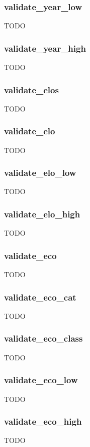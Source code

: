\documentclass{article}
\begin{document}
\subsubsection*{validate\_year\_low}
TODO

\subsubsection*{validate\_year\_high}
TODO

\subsubsection*{validate\_elos}
TODO

\subsubsection*{validate\_elo}
TODO

\subsubsection*{validate\_elo\_low}
TODO

\subsubsection*{validate\_elo\_high}
TODO

\subsubsection*{validate\_eco}
TODO

\subsubsection*{validate\_eco\_cat}
TODO

\subsubsection*{validate\_eco\_class}
TODO

\subsubsection*{validate\_eco\_low}
TODO

\subsubsection*{validate\_eco\_high}
TODO
\end{document}
